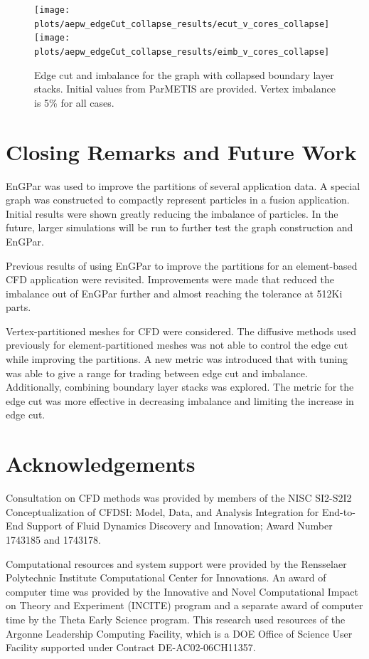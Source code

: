 \documentclass[conference]{IEEEtran}
\begin{document}
\begin{figure}[!ht]
  \centering
  \texttt{[image: plots/aepw\_edgeCut\_collapse\_results/ecut\_v\_cores\_collapse]}
  \texttt{[image: plots/aepw\_edgeCut\_collapse\_results/eimb\_v\_cores\_collapse]}
  \caption{Edge cut and imbalance for the graph with collapsed boundary layer stacks. Initial values from ParMETIS are provided. Vertex imbalance is 5\% for all cases.}
  \label{fig:collapse}
\end{figure}

\section{Closing Remarks and Future Work} \label{sec:closing}


EnGPar was used to improve the partitions of several application data. A special graph was
constructed to compactly represent particles in a fusion application. Initial results were
shown greatly reducing the imbalance of particles. In the future, larger simulations will
be run to further test the graph construction and EnGPar.

Previous results of using EnGPar to improve the partitions for an element-based CFD application
were revisited. Improvements were made that reduced the imbalance out of EnGPar further and
almost reaching the tolerance at 512Ki parts.

Vertex-partitioned meshes for CFD were considered. The diffusive methods used previously for
element-partitioned meshes was not able to control the edge cut while improving the partitions.
A new metric was introduced that with tuning was able to give a range for trading between edge
cut and imbalance. Additionally, combining boundary layer stacks was explored. The metric for
the edge cut was more effective in decreasing imbalance and limiting the increase in edge cut.



\section{Acknowledgements}

Consultation on CFD methods was provided by members of the NISC SI2-S2I2
Conceptualization of CFDSI: Model, Data, and Analysis Integration for End-to-End
Support of Fluid Dynamics Discovery and Innovation; Award Number 1743185 and 
1743178.

Computational resources and system support were provided by the Rensselaer
Polytechnic Institute Computational Center for Innovations.
An award of computer time was provided by the Innovative and Novel Computational
Impact on Theory and Experiment (INCITE) program and a separate award of
computer time by the Theta Early Science program.
This research used resources of the Argonne Leadership Computing Facility, which
is a DOE Office of Science User Facility supported under Contract
DE-AC02-06CH11357.



\end{document}
